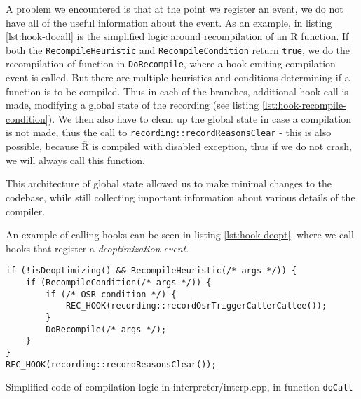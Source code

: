 A problem we encountered is that at the point we register an event, we do not have all of the useful information about the event. As an example, in listing \ref{lst:hook-docall} is the simplified logic around recompilation of an R function. If both the \texttt{RecompileHeuristic} and \texttt{RecompileCondition} return \texttt{true}, we do the recompilation of function in \texttt{DoRecompile}, where a hook emiting compilation event is called. But there are multiple heuristics and conditions determining if a function is to be compiled. Thus in each of the branches, additional hook call is made, modifying a global state of the recording (see listing \ref{lst:hook-recompile-condition}). We then also have to clean up the global state in case a compilation is not made, thus the call to \texttt{recording::recordReasonsClear} - this is also possible, because Ř is compiled with disabled exception, thus if we do not crash, we will always call this function.

This architecture of global state allowed us to make minimal changes to the codebase, while still collecting important information about various details of the compiler.

An example of calling hooks can be seen in listing \ref{lst:hook-deopt}, where we call hooks that register a \textit{deoptimization event}.

\begin{listing}
	\begin{verbatim}
if (!isDeoptimizing() && RecompileHeuristic(/* args */)) {
    if (RecompileCondition(/* args */)) {
        if (/* OSR condition */) {
            REC_HOOK(recording::recordOsrTriggerCallerCallee());
        }
        DoRecompile(/* args */);
    }
}
REC_HOOK(recording::recordReasonsClear());
  \end{verbatim}
	\caption{Simplified code of compilation logic in interpreter/interp.cpp, in function \texttt{doCall}}\label{lst:hook-docall}
\end{listing}

